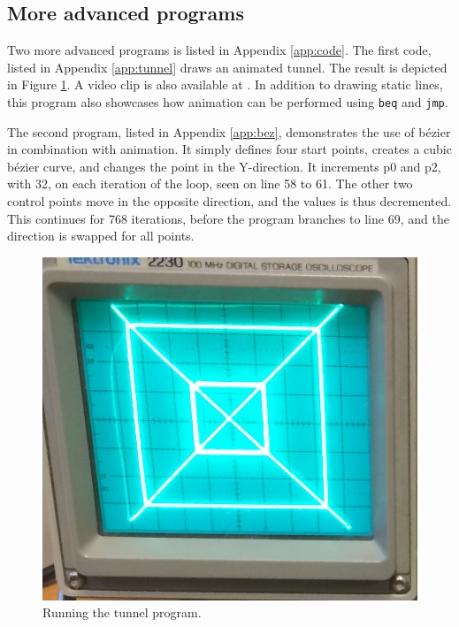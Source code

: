 \subsection{More advanced programs}
Two more advanced programs is listed in Appendix \ref{app:code}.
The first code, listed in Appendix \ref{app:tunnel} draws an animated tunnel.
The result is depicted in Figure \ref{fig:tunnel}.
A video clip is also available at \cite{tunnel-demo}.
In addition to drawing static lines, this program also showcases how animation can be performed using \texttt{beq} and \texttt{jmp}.

The second program, listed in Appendix \ref{app:bez}, demonstrates the use of bézier in combination with animation.
It simply defines four start points, creates a cubic bézier curve, and changes the point in the Y-direction. It increments p0 and p2, with 32, on each iteration of the loop, seen on line 58 to 61.
The other two control points move in the opposite direction, and the values is thus decremented. This continues for 768 iterations, before the program branches to line 69, and the direction is swapped for all points.

\begin{figure}[h]
	\centering
	\includegraphics[]{images/tunnel.jpg}
	\caption{Running the tunnel program.}
	\label{fig:tunnel}
\end{figure}
